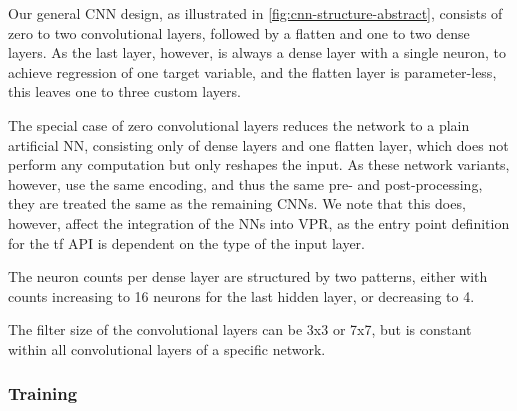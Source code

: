 Our general \gls{CNN} design, as illustrated in \ref{fig:cnn-structure-abstract}, consists of zero to two convolutional layers, followed by a flatten and one to two dense layers. As the last layer, however, is always a dense layer with a single neuron, to achieve regression of one target variable, and the flatten layer is parameter-less, this leaves one to three custom layers. 

The special case of zero convolutional layers reduces the network to a plain artificial \gls{NN}, consisting only of dense layers and one flatten layer, which does not perform any computation but only reshapes the input. As these network variants, however, use the same encoding, and thus the same pre- and post-processing, they are treated the same as the remaining \glspl{CNN}. We note that this does, however, affect the integration of the \glspl{NN} into \gls{VPR}, as the entry point definition for the \gls{tf} API is dependent on the type of the input layer.\cite{TODO-changed}

The neuron counts per dense layer are structured by two patterns, either with counts increasing to 16 neurons for the last hidden layer, or decreasing to 4.

The filter size of the convolutional layers can be 3x3 or 7x7, but is constant within all convolutional layers of a specific network.

\subsubsection{Training}

